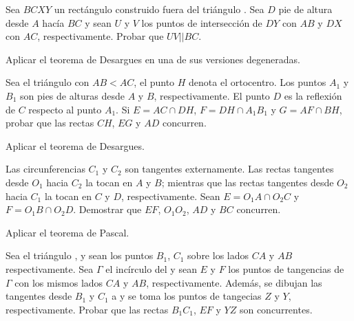 \begin{section-problem}
    Sea $BCXY$ un rectángulo construido fuera del triángulo .
    Sea $D$ pie de altura desde $A$ hacía $BC$ y sean $U$ y $V$ los puntos de intersección de $DY$ con $AB$ y $DX$ con $AC$, respectivamente.
    Probar que $UV || BC$.
\end{section-problem}

\begin{hint}
    Aplicar el teorema de Desargues en una de sus versiones degeneradas.
\end{hint}

\begin{section-problem}
    Sea el triángulo  con $AB < AC$, el punto $H$ denota el ortocentro.
    Los puntos $A_1$ y $B_1$ son pies de alturas desde $A$ y $B$, respectivamente.
    El punto $D$ es la reflexión de $C$ respecto al punto $A_1$.
    Si $E = AC \cap DH$, $F = DH \cap A_1 B_1$ y $G = AF \cap BH$, probar que las rectas $CH$, $EG$ y $AD$ concurren.
\end{section-problem}

\begin{hint}
    Aplicar el teorema de Desargues.
\end{hint}


\begin{section-problem}
    Las circunferencias $C_1$ y $C_2$ son tangentes externamente.
    Las rectas tangentes desde $O_1$ hacia $C_2$ la tocan en $A$ y $B$; mientras que las rectas tangentes desde $O_2$ hacia $C_1$ la tocan en $C$ y $D$, respectivamente.
    Sean $E = O_1 A \cap O_2 C$ y $F = O_1 B \cap O_2 D$.
    Demostrar que $EF$, $O_1 O_2$, $AD$ y $BC$ concurren.
\end{section-problem}

\begin{hint}
    Aplicar el teorema de Pascal.
\end{hint}

\begin{section-problem}
    Sea el triángulo , y sean los puntos $B_1$, $C_1$ sobre los lados $CA$ y $AB$ respectivamente.
    Sea $\Gamma$ el incírculo del  y sean $E$ y $F$ los puntos de tangencias de $\Gamma$ con los mismos lados $CA$ y $AB$, respectivamente.
    Además, se dibujan las tangentes desde $B_1$ y $C_1$ a  y se toma los puntos de tangecias $Z$ y $Y$, respectivamente.
    Probar que las rectas $B_1 C_1$, $EF$ y $YZ$ son concurrentes.
\end{section-problem}

